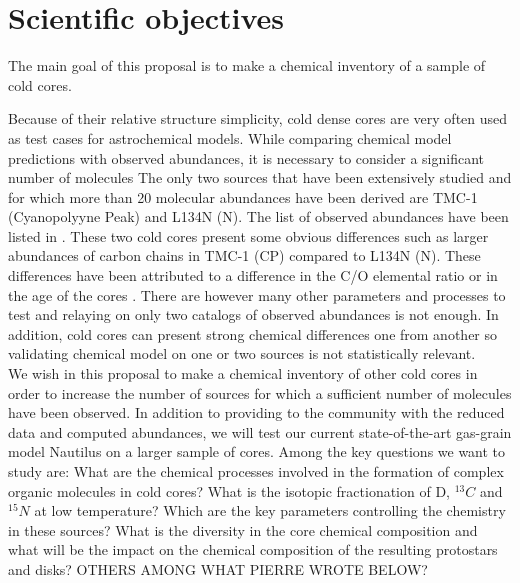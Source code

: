 \section{Scientific objectives}

The main goal of this proposal is to make a chemical inventory of a sample of cold cores.

Because of their relative structure simplicity, cold dense cores are very often used as test cases for astrochemical models. While comparing chemical model predictions with observed abundances, it is necessary to consider a significant number of molecules \cite{Wakelam_2006,2013ChRv..113.8710A} The only two sources that have been extensively studied and for which more than 20 molecular abundances have been derived are TMC-1 (Cyanopolyyne Peak) and L134N (N). The list of observed abundances have been listed in \cite{2013ChRv..113.8710A}. These two cold cores present some obvious differences such as larger abundances of carbon chains in TMC-1 (CP) compared to L134N (N). These differences have been attributed to a difference in the C/O elemental ratio \cite{1998ApJ...501..207T} or in the age of the cores \cite{2013ChRv..113.8710A}. There are however many other parameters and processes to test and relaying on only two catalogs of observed abundances is not enough. In addition, cold cores can present strong chemical differences one from another \cite{2006FaDi..133...63B} so validating chemical model on one or two sources is not statistically relevant.\\



We wish in this proposal to make a chemical inventory of other cold cores in order to increase the number of sources for which a sufficient number of molecules have been observed. In addition to providing to the community with the reduced data and computed abundances, we will test our current state-of-the-art gas-grain model Nautilus \cite{2015MNRAS.447.4004R} on a larger sample of cores.  Among the key questions we want to study are: What are the chemical processes involved in the formation of complex organic molecules in cold cores? What is the isotopic fractionation of D, $^{13}C$ and $^{15}N$ at low temperature? Which are the key parameters controlling the chemistry in these sources? 
What is the diversity in the core chemical composition and what will be the impact on the chemical composition of the resulting protostars and disks?  OTHERS AMONG WHAT PIERRE WROTE BELOW?

